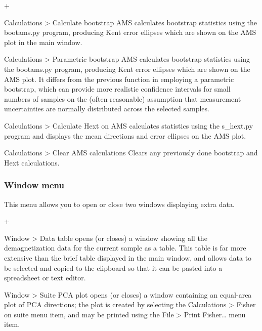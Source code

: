 \documentclass[a4paper,british]{article}
\newcommand{\menuitemlabel}[1]{%
\mbox{\textsf{#1}}\hfil}
\newenvironment{menuitemlist}%
{\begin{list}{}{%
\renewcommand{\makelabel}{\menuitemlabel}%
\setlength{\labelwidth}{35pt}%
\setlength{\leftmargin}%
             {\labelwidth+\labelsep}}}%
{\end{list}}
\newcommand{\ppcmd}[1]{\textsf{#1}} %
\newcommand{\caps}[1]{\MakeTextUppercase{#1}} %
\newcommand{\submenu}{ \textgreater{} } %
\begin{document}
\begin{menuitemlist}

\item[Calculations\submenu Calculate bootstrap \caps{ams}] calculates
bootstrap statistics using the \ppcmd{bootams.py} program, producing
Kent error ellipses which are shown on the \caps{ams} plot in the main
window.

\item[Calculations\submenu Parametric bootstrap \caps{ams}] calculates
bootstrap statistics using the \ppcmd{bootams.py} program, producing Kent
error ellipses which are shown on the \caps{ams} plot. It differs from the
previous function in employing a parametric bootstrap, which can provide more
realistic confidence intervals for small numbers of samples on the (often
reasonable) assumption that measurement uncertainties are normally
distributed across the selected samples.

\item[Calculations\submenu Calculate Hext on \caps{ams}] calculates
\cite{hext1963tensors} statistics using the \ppcmd{s\_hext.py} program
and displays the mean directions and error ellipses on the \caps{ams} plot.

\item[Calculations\submenu Clear \caps{ams} calculations] Clears
any previously done bootstrap and Hext calculations.

\end{menuitemlist}

\subsubsection{Window menu}

This menu allows you to open or close two windows displaying extra data.

\begin{menuitemlist}

\item[Window\submenu Data table] opens (or closes) a window showing
all the demagnetization data for the current sample as a table. This
table is far more extensive than the brief table displayed in the
main window, and allows data to be selected and copied to the clipboard
so that it can be pasted into a spreadsheet or text editor.

\item[Window\submenu Suite \caps{pca} plot] opens (or closes) a window
containing an equal-area plot of \caps{pca} directions; the plot is created
by selecting the \ppcmd{Calculations\submenu Fisher on suite} menu item,
and may be printed using the \ppcmd{File\submenu Print Fisher\ldots} menu item.

\end{menuitemlist}
\end{document}
